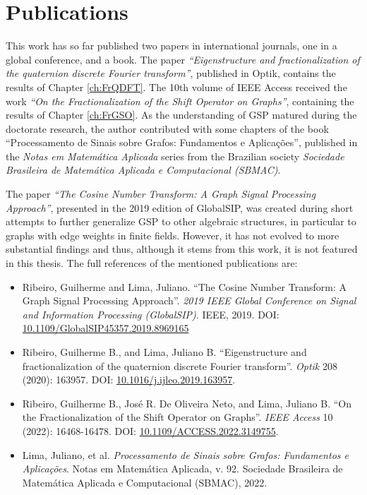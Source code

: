 \section{Publications}

This work has so far published two papers in international journals, one in a global conference, and a book. The paper \textit{``Eigenstructure and fractionalization of the quaternion discrete Fourier transform''}, published in Optik, contains the results of Chapter \ref{ch:FrQDFT}. The 10th volume of IEEE Access received the work \textit{``On the Fractionalization of the Shift Operator on Graphs''}, containing the results of Chapter \ref{ch:FrGSO}. As the understanding of GSP matured during the doctorate research, the author contributed with some chapters of the book ``Processamento de Sinais sobre Grafos: Fundamentos e Aplica{\c c}{\~o}es'', published in the \textit{Notas em Matem\'atica Aplicada} series from the Brazilian society \textit{Sociedade Brasileira de Matemática Aplicada e Computacional (SBMAC)}.

The paper \emph{``The Cosine Number Transform: A Graph Signal Processing Approach''}, presented in the 2019 edition of GlobalSIP, was created during short attempts to further generalize GSP to other algebraic structures, in particular to graphs with edge weights in finite fields. However, it has not evolved to more substantial findings and thus, although it stems from this work, it is not featured in this thesis. The full references of the mentioned publications are:

\begin{itemize}[noitemsep]
\item Ribeiro, Guilherme and Lima, Juliano. ``The Cosine Number Transform: A Graph Signal Processing Approach''. \textit{2019 IEEE Global Conference on Signal and Information Processing (GlobalSIP)}. IEEE, 2019. DOI: \href{https://doi.org/10.1109/GlobalSIP45357.2019.8969165}{10.1109/GlobalSIP45357.2019.8969165}

\item Ribeiro, Guilherme B., and Lima, Juliano B. ``Eigenstructure and fractionalization of the quaternion discrete Fourier transform''. \textit{Optik} 208 (2020): 163957. DOI: \href{https://doi.org/10.1016/j.ijleo.2019.163957}{10.1016/j.ijleo.2019.163957}.

\item Ribeiro, Guilherme B., José R. De Oliveira Neto, and Lima, Juliano B. ``On the Fractionalization of the Shift Operator on Graphs''. \textit{IEEE Access} 10 (2022): 16468-16478. DOI: \href{https://doi.org/10.1109/ACCESS.2022.3149755}{10.1109/ACCESS.2022.3149755}.

\item Lima, Juliano, et al. \textit{Processamento de Sinais sobre Grafos: Fundamentos e Aplica{\c c}{\~o}es}. Notas em Matem\'atica Aplicada, v. 92. Sociedade Brasileira de Matemática Aplicada e Computacional (SBMAC), 2022.
\end{itemize}

